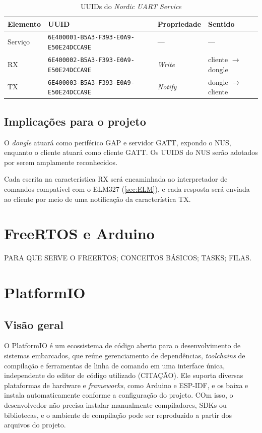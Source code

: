 \begin{table}[htb]
\centering
\caption{UUIDs do \textit{Nordic UART Service}}
\label{tab:nus}
\begin{tabular}{llll}
\hline
Elemento & UUID & Propriedade & Sentido \\ \hline
Serviço & \texttt{6E400001-B5A3-F393-E0A9-E50E24DCCA9E} & --- & --- \\
RX & \texttt{6E400002-B5A3-F393-E0A9-E50E24DCCA9E} & \textit{Write} & cliente $\rightarrow$ dongle \\
TX & \texttt{6E400003-B5A3-F393-E0A9-E50E24DCCA9E} & \textit{Notify} & dongle $\rightarrow$ cliente \\ \hline
\end{tabular}
\end{table}

\subsection{Implicações para o projeto}

O \textit{dongle} atuará como periférico GAP e servidor GATT, expondo o NUS, enquanto o cliente atuará como cliente GATT. Os UUIDS do NUS serão adotados por serem amplamente reconhecidos. 

Cada escrita na característica RX será encaminhada ao interpretador de comandos compatível com o ELM327 (\autoref{sec:ELM}), e cada resposta será enviada ao cliente por meio de uma notificação da característica TX.


\section{FreeRTOS e Arduino}

PARA QUE SERVE O FREERTOS; CONCEITOS BÁSICOS; TASKS; FILAS. 

\section{PlatformIO} \label{sec:PLATFOMIO}

\subsection{Visão geral}
O PlatformIO é um ecossistema de código aberto para o desenvolvimento de sistemas embarcados, que reúne gerenciamento de dependências, \textit{toolchains} de compilação e ferramentas de linha de comando em uma interface única, independente do editor de código utilizado (CITAÇÃO). Ele suporta diversas plataformas de hardware e \textit{frameworks}, como Arduino e ESP-IDF, e os baixa e instala automaticamente conforme a configuração do projeto. COm isso, o desenvolvedor não precisa instalar manualmente compiladores, SDKs ou bibliotecas, e o ambiente de compilação pode ser reproduzido a partir dos arquivos do projeto.

